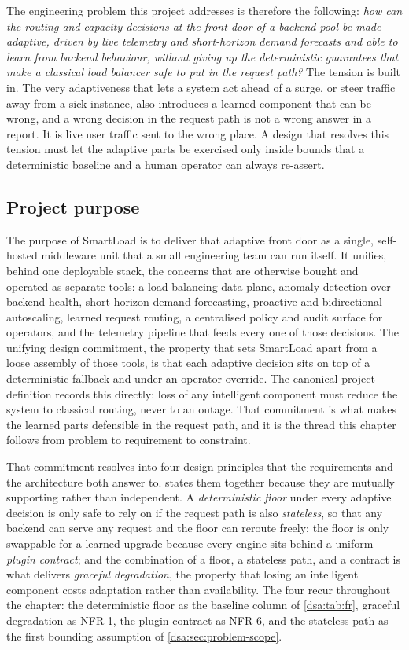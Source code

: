 The engineering problem this project addresses is therefore the following: \emph{how
can the routing and capacity decisions at the front door of a backend pool be made
adaptive, driven by live telemetry and short-horizon demand forecasts and able
to learn from backend behaviour, without giving up the deterministic
guarantees that make a classical load balancer safe to put in the request path?}
The tension is built in. The very adaptiveness that lets a system act ahead of a
surge, or steer traffic away from a sick instance, also introduces a learned
component that can be wrong, and a wrong decision in the request path is not a
wrong answer in a report. It is live user traffic sent to the wrong place. A
design that resolves this tension must let the adaptive parts be exercised only
inside bounds that a deterministic baseline and a human operator can always
re-assert.

\subsection{Project purpose}
\label{dsa:sec:problem-purpose}

The purpose of SmartLoad is to deliver that adaptive front door as a single,
self-hosted middleware unit that a small engineering team can run itself. It
unifies, behind one deployable stack, the concerns that are otherwise bought and
operated as separate tools: a load-balancing data plane, anomaly detection over
backend health, short-horizon demand forecasting, proactive and bidirectional
autoscaling, learned request routing, a centralised policy and audit surface for
operators, and the telemetry pipeline that feeds every one of those decisions. The
unifying design commitment, the property that sets SmartLoad apart from a
loose assembly of those tools, is that each adaptive decision sits on top of a
deterministic fallback and under an operator override. The canonical project
definition records this directly: loss of any intelligent component must reduce the
system to classical routing, never to an outage. That commitment is what makes the
learned parts defensible in the request path, and it is the thread this chapter
follows from problem to requirement to constraint.

That commitment resolves into four design principles that the requirements and the
architecture both answer to.  states them together because
they are mutually supporting rather than independent. A \emph{deterministic floor}
under every adaptive decision is only safe to rely on if the request path is also
\emph{stateless}, so that any backend can serve any request and the floor can reroute
freely; the floor is only swappable for a learned upgrade because every engine sits
behind a uniform \emph{plugin contract}; and the combination of a floor, a stateless
path, and a contract is what delivers \emph{graceful degradation}, the property that
losing an intelligent component costs adaptation rather than availability. The four
recur throughout the chapter: the deterministic floor as the baseline column of
\cref{dsa:tab:fr}, graceful degradation as NFR-1, the plugin contract as NFR-6, and
the stateless path as the first bounding assumption of \cref{dsa:sec:problem-scope}.

